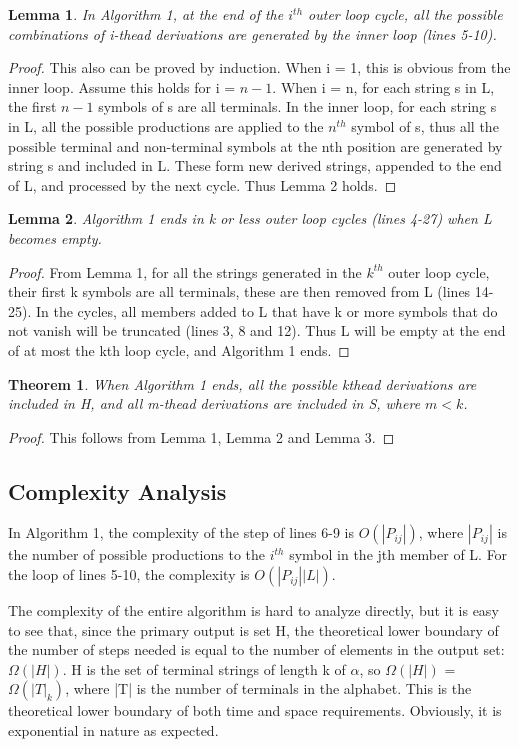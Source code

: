 \documentclass{sig-alternate-05-2015}
\newtheorem{theorem}{Theorem}
\newtheorem{lemma}{Lemma}
\begin{document}
\begin{lemma}
In Algorithm 1, at the end of the $i^{th}$ outer
loop cycle, all the possible combinations of i-thead derivations
are generated by the inner loop (lines 5-10).
\end{lemma}
\begin{proof}
This also can be proved by induction. When i = 1,
this is obvious from the inner loop. Assume this holds for i
= $n-1$. When i = n, for each string s in L, the first $n-1$ symbols
of s are all terminals. In the inner loop, for each string
s in L, all the possible productions are applied to the $n^{th}$
symbol of s, thus all the possible terminal and non-terminal
symbols at the nth position are generated by string s and
included in L. These form new derived strings, appended to
the end of L, and processed by the next cycle. Thus Lemma
2 holds.
\end{proof}

\begin{lemma}
Algorithm 1 ends in k or less outer loop cycles
(lines 4-27) when L becomes empty.
\end{lemma}
\begin{proof}
From Lemma 1, for all the strings generated in
the $k^{th}$ outer loop cycle, their first k symbols are all terminals,
these are then removed from L (lines 14-25). In the
cycles, all members added to L that have k or more symbols
that do not vanish will be truncated (lines 3, 8 and 12).
Thus L will be empty at the end of at most the kth loop
cycle, and Algorithm 1 ends.
\end{proof}

\begin{theorem}
When Algorithm 1 ends, all the possible kthead
derivations are included in H, and all m-thead derivations
are included in S, where $m < k$.
\end{theorem}
\begin{proof}
This follows from Lemma 1, Lemma 2 and
Lemma 3.
\end{proof}


\subsection{Complexity Analysis}
In Algorithm 1, the complexity of the step of lines 6-9 is
$O(|P_{ij}|)$, where $|P_{ij}|$ is the number of possible productions to
the $i^{th}$ symbol in the jth member of L. For the loop of lines
5-10, the complexity is $O(|P_{ij}||L|)$.

The complexity of the entire algorithm is hard to analyze
directly, but it is easy to see that, since the primary output
is set H, the theoretical lower boundary of the number of
steps needed is equal to the number of elements in the output
set: $\Omega(|H|)$. H is the set of terminal strings of length k of
$\alpha$, so $\Omega(|H|)$ = $\Omega(|T|_k)$, where |T| is the number of terminals
in the alphabet. This is the theoretical lower boundary of
both time and space requirements. Obviously, it is exponential
in nature as expected.
\end{document}
